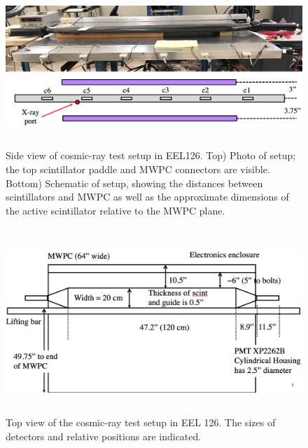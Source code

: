 \documentclass[12pt]{article}
\begin{document}
      
\begin{figure}[tbph]
\begin{center}
\includegraphics[height=6cm,clip=true]{EEL126_test_elevation}
\caption{Side view of cosmic-ray test setup in EEL126. Top) Photo of setup; the top scintillator paddle and MWPC connectors are visible. Bottom) Schematic of setup, showing
the distances between scintillators and MWPC as well as the approximate dimensions of the active scintillator relative to the MWPC plane.
\label{fig:EEL126_test_elevation}}
\end{center}
\end{figure}     


\begin{figure}[tbph]
\begin{center}
\includegraphics[height=7cm,clip=true]{EEL126_test_plan}
\caption{Top view of the cosmic-ray test setup in EEL 126. The sizes of detectors and relative positions are indicated.
\label{fig:EEL126_test_plan}}
\end{center}
\end{figure} 
\end{document}
